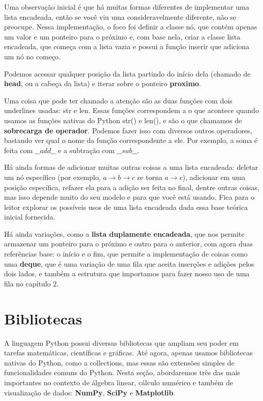 \documentclass[11pt, a4paper]{article}
\begin{document}
Uma observação inicial é que há muitas formas diferentes de implementar uma lista encadeada, então se você viu uma consideravelmente diferente, não se preocupe. Nessa implementação, o foco foi definir a classe nó, que contém apenas um valor e um ponteiro para o próximo e, com base nela, criar a classe lista encadeada, que começa com a lista vazia e possui a função inserir que adiciona um nó no começo.

Podemos acessar qualquer posição da lista partindo do início dela (chamado de \textbf{head}, ou a cabeça da lista) e iterar sobre o ponteiro \textbf{proximo}.

Uma coisa que pode ter chamado a atenção são as duas funções com dois underlines usadas: str e len. Essas funções correspondem a o que acontece quando usamos as funções nativas do Python str() e len(), e são o que chamamos de \textbf{sobrecarga de operador}. Podemos fazer isso com diversos outros operadores, bastando ver qual o nome da função correspondente a ele. Por exemplo, a soma é feita com \(\_\_add\_\_\) e a subtração com \(\_\_sub\_\_\).

Há ainda formas de adicionar muitas outras coisas a uma lista encadeada: deletar um nó específico (por exemplo, \(a \rightarrow b \rightarrow c\) se torna \(a \rightarrow c\)), adicionar em uma posição específica, refazer ela para a adição ser feita no final, dentre outras coisas, mas isso depende muito do seu modelo e para que você está usando. Fica para o leitor explorar os possíveis usos de uma lista encadeada dada essa base teórica inicial fornecida.

Há ainda variações, como a \textbf{lista duplamente encadeada}, que nos permite armazenar um ponteiro para o próximo e outro para o anterior, com agora duas referências base: o início e o fim, que permite a implementação de coisas como uma \textbf{deque}, que é uma variação de uma fila que aceita inserções e adições pelos dois lados, e também a estrutura que importamos para fazer nosso uso de uma fila no capítulo 2.

\newpage

\section{Bibliotecas}

A linguagem Python possui diversas bibliotecas que ampliam seu poder em tarefas matemáticas, científicas e gráficas. Até agora, apenas usamos bibliotecas nativas do Python, como a collections, mas essas são extensões simples de funcionalidades comuns do Python. Nesta seção, abordaremos três das mais importantes no contexto de álgebra linear, cálculo numérico e também de visualização de dados: \textbf{NumPy}, \textbf{SciPy} e \textbf{Matplotlib}.
\end{document}
